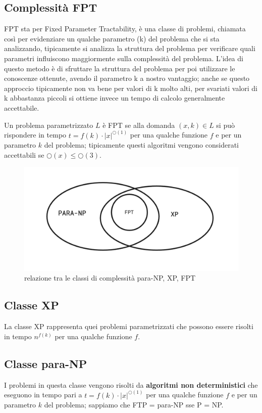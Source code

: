\documentclass[12pt,a4paper]{article}
\begin{document}
\subsection{Complessità FPT}
FPT sta per Fixed Parameter Tractability, è una classe di problemi, chiamata così per evidenziare un qualche parametro (k) del problema che si sta analizzando, tipicamente si analizza la struttura del problema per verificare quali parametri influiscono maggiormente sulla complessità del problema. L'idea di questo metodo è di sfruttare la struttura del problema per poi utilizzare le conoscenze ottenute, avendo il parametro k a nostro vantaggio; anche se questo approccio tipicamente non va bene per valori di k molto alti, per svariati valori di k abbastanza piccoli si ottiene invece un tempo di calcolo generalmente accettabile.

Un problema parametrizzato $L$ è FPT se alla domanda $(x, k) \in L$ si può rispondere in tempo $t = f(k) \cdot {\vert x \vert}^{\bigcirc(1)}$ per una qualche funzione $f$ e per un parametro $k$ del problema; tipicamente questi algoritmi vengono considerati accettabili se $\bigcirc(x) \leqslant \bigcirc(3)$.

\begin{figure}[h]
	\centering
	\includegraphics[width=0.8\linewidth]{img/para_comp}
	\caption{relazione tra le classi di complessità para-NP, XP, FPT}
	\label{fig:8}
\end{figure}

\subsection{Classe XP}
La classe XP rappresenta quei problemi parametrizzati che possono essere risolti in tempo $n^{f(k)}$ per una qualche funzione $f$.

\subsection{Classe para-NP}
I problemi in questa classe vengono risolti da \textbf{algoritmi non deterministici} che eseguono in tempo pari a $t = f(k) \cdot {\vert x \vert}^{\bigcirc(1)}$ per una qualche funzione $f$ e per un parametro $k$ del problema; sappiamo che FTP = para-NP sse P = NP.
\end{document}
